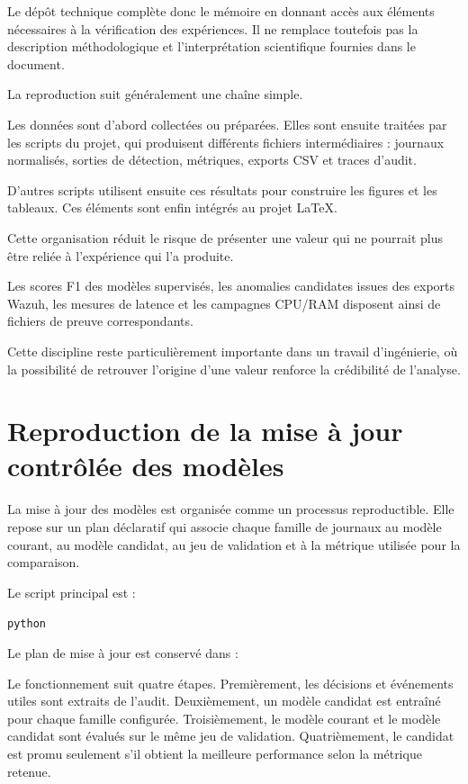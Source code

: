 Le dépôt technique complète donc le mémoire en donnant accès aux éléments nécessaires à la vérification des expériences. Il ne remplace toutefois pas la description méthodologique et l'interprétation scientifique fournies dans le document.

La reproduction suit généralement une chaîne simple.

Les données sont d'abord collectées ou préparées. Elles sont ensuite traitées par les scripts du projet, qui produisent différents fichiers intermédiaires : journaux normalisés, sorties de détection, métriques, exports CSV et traces d'audit.

D'autres scripts utilisent ensuite ces résultats pour construire les figures et les tableaux. Ces éléments sont enfin intégrés au projet LaTeX.

Cette organisation réduit le risque de présenter une valeur qui ne pourrait plus être reliée à l'expérience qui l'a produite.

Les scores F1 des modèles supervisés, les anomalies candidates issues des exports Wazuh, les mesures de latence et les campagnes CPU/RAM disposent ainsi de fichiers de preuve correspondants.

Cette discipline reste particulièrement importante dans un travail d'ingénierie, où la possibilité de retrouver l'origine d'une valeur renforce la crédibilité de l'analyse.

\section{Reproduction de la mise à jour contrôlée des modèles}

La mise à jour des modèles est organisée comme un processus reproductible. Elle repose sur un plan déclaratif qui associe chaque famille de journaux au modèle courant, au modèle candidat, au jeu de validation et à la métrique utilisée pour la comparaison.

Le script principal est :

\begin{center}
\texttt{python} 
\end{center}

Le plan de mise à jour est conservé dans :

\begin{center}
\end{center}

Le fonctionnement suit quatre étapes. Premièrement, les décisions et événements utiles sont extraits de l'audit. Deuxièmement, un modèle candidat est entraîné pour chaque famille configurée. Troisièmement, le modèle courant et le modèle candidat sont évalués sur le même jeu de validation. Quatrièmement, le candidat est promu seulement s'il obtient la meilleure performance selon la métrique retenue.

